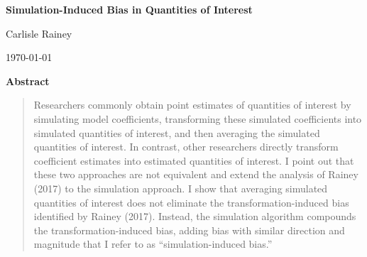 \documentclass[12pt]{article}
\begin{document}
\begin{center}

{\Large \textbf{Simulation-Induced Bias in Quantities of Interest}}

\vspace{1cm}

Carlisle Rainey

\vspace{1cm}
\today
\end{center}
\vspace{5mm}



{\centerline{\textbf{Abstract}}}
\begin{quote}\noindent
Researchers commonly obtain point estimates of quantities of interest by simulating model coefficients, transforming these simulated coefficients into simulated quantities of interest, and then averaging the simulated quantities of interest. 
In contrast, other researchers directly transform coefficient estimates into estimated quantities of interest. 
I point out that these two approaches are not equivalent and extend the analysis of Rainey (2017) to the simulation approach.
I show that averaging simulated quantities of interest does not eliminate the transformation-induced bias identified by Rainey (2017). 
Instead, the simulation algorithm compounds the transformation-induced bias, adding bias with similar direction and magnitude that I refer to as ``simulation-induced bias.'' 
\end{quote}


\end{document}

